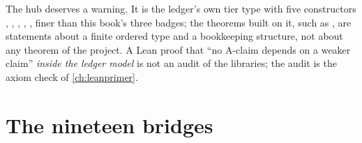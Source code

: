 The hub  deserves a warning. It is the ledger's own tier
type with five constructors , , , , 
, finer than this book's three badges; the
theorems built on it, such as , are statements
about a finite ordered type and a bookkeeping structure, not about any theorem of the
project. A Lean proof that ``no A-claim depends on a weaker claim'' \emph{inside the
ledger model} is not an audit of the libraries; the audit is the axiom check of
\cref{ch:leanprimer}.

\section{The nineteen bridges}\label{sec:atlas:bridges}

